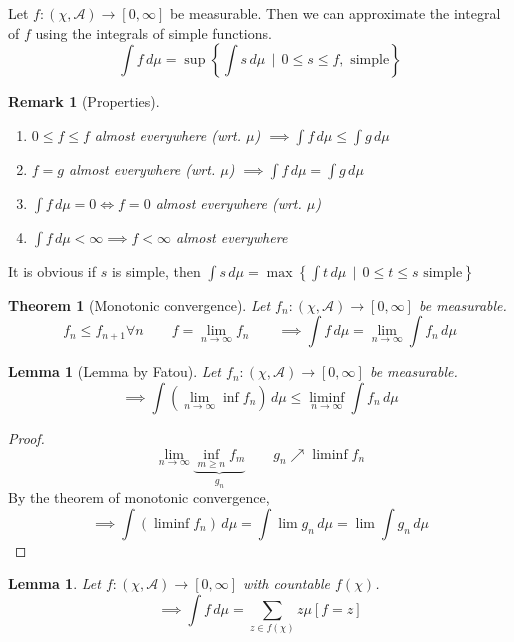 \documentclass[a4paper]{article}
\newcounter{lecref}[section]
\numberwithin{lecref}{section}
\theoremstyle{break}
\newtheorem*{Theorem}{Theorem}
\newtheorem{lemma}[lecref]{Lemma}
\newtheorem*{Lemma}{Lemma}
\newtheorem*{Remark}{Remark}
\newcommand{\SetDef}[2]{\left\{#1\,\mid\,#2\right\}}
\begin{document}
Let $f: (\chi, \mathcal A) \to [0, \infty]$ be measurable. Then we can approximate the integral of $f$ using the integrals of simple functions.
\[ \int f \, d\mu = \sup\SetDef{\int s \, d\mu}{0 \leq s \leq f, \text{ simple}} \]

\begin{Remark}[Properties]
  \begin{enumerate}
    \item $0 \leq f \leq f$ almost everywhere (wrt. $\mu$) $\implies \int f \, d\mu \leq \int g \, d\mu$
    \item $f = g$ almost everywhere (wrt. $\mu$) $\implies \int f \, d\mu = \int g \, d\mu$
    \item $\int f \, d\mu = 0 \iff f = 0$ almost everywhere (wrt. $\mu$)
    \item $\int f \, d\mu < \infty \implies f < \infty$ almost everywhere
  \end{enumerate}
\end{Remark}

It is obvious if $s$ is simple, then $\int s \, d\mu = \max\SetDef{\int t \, d\mu}{0 \leq t \leq s \text{ simple}}$

\begin{Theorem}[Monotonic convergence]
  Let $f_n: (\chi, \mathcal A) \to [0, \infty]$ be measurable.
  \[ f_n \leq f_{n+1} \forall n \qquad f = \lim_{n\to\infty} f_n \qquad \implies \int f \, d\mu = \lim_{n\to\infty} \int f_n \, d\mu \]
\end{Theorem}

\begin{Lemma}[Lemma by Fatou]
  Let $f_n: (\chi, \mathcal A) \to [0, \infty]$ be measurable.
  \[ \implies \int \left(\lim_{n\to\infty} \inf{f_n}\right) \, d\mu \leq \liminf_{n\to\infty} \int f_n \, d\mu \]
\end{Lemma}

\begin{proof}
  \[ \lim_{n\to\infty} \underbrace{\inf_{m \geq n} f_m}_{g_n} \qquad g_n \nearrow \liminf f_n \]
  By the theorem of monotonic convergence,
  \[ \implies \int \left(\liminf f_n\right) \, d\mu = \int \lim{g_n} \, d\mu = \lim \int g_n \, d\mu \]
\end{proof}

\begin{lemma}
  Let $f: (\chi, \mathcal A) \to [0, \infty]$ with countable $f(\chi)$.
  \[ \implies \int f \, d\mu = \sum_{z \in f(\chi)} z \mu[f = z] \]
\end{lemma}
\end{document}
